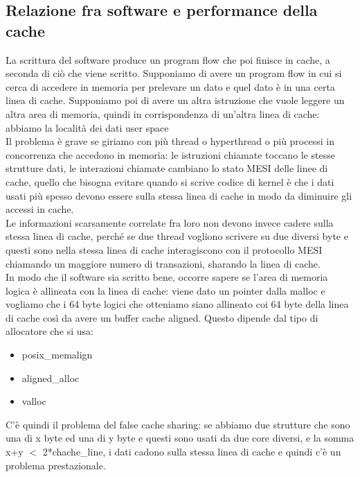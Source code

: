 \documentclass[12pt, oneside]{extbook}
\begin{document}
\subsection{Relazione fra software e performance della cache}
La scrittura del software produce un program flow che poi finisce in cache, a seconda di ciò che viene scritto. Supponiamo di avere un program flow in cui si cerca di accedere in memoria per prelevare un dato e quel dato è in una certa linea di cache. Supponiamo poi di avere un altra istruzione che vuole leggere un altra area di memoria, quindi in corrispondenza di un'altra linea di cache: abbiamo la località dei dati user space\\ Il problema è grave se giriamo con più thread o hyperthread o più processi in concorrenza che accedono in memoria: le istruzioni chiamate toccano le stesse strutture dati, le interazioni chiamate cambiano lo stato MESI delle linee di cache, quello che bisogna evitare quando si scrive codice di kernel è che i dati usati più spesso devono essere sulla stessa linea di cache in modo da diminuire gli accessi in cache.\\ Le informazioni scarsamente correlate fra loro non devono invece cadere sulla stessa linea di cache, perché se due thread vogliono scrivere su due diversi byte e questi sono nella stessa linea di cache interagiscono con il protocollo MESI chiamando un maggiore numero di transazioni, sharando la linea di cache.\\ In modo che il software sia scritto bene, occorre sapere se l'area di memoria logica è allineata con la linea di cache: viene dato un pointer dalla malloc e vogliamo che i 64 byte logici che otteniamo siano allineato coi 64 byte della linea di cache così da avere un buffer cache aligned. Questo dipende dal tipo di allocatore che si usa:
\begin{itemize}
\item \textsf{posix\_memalign }
\item \textsf{aligned\_alloc }
\item \textsf{valloc }
\end{itemize}
C'è quindi il problema del false cache sharing: se abbiamo due strutture che sono una di x byte ed una di y byte e questi sono usati da due core diversi, e la somma x+y $<$ 2*chache\_line, i dati cadono sulla stessa linea di cache e quindi c'è un problema prestazionale.\\ 
\end{document}
